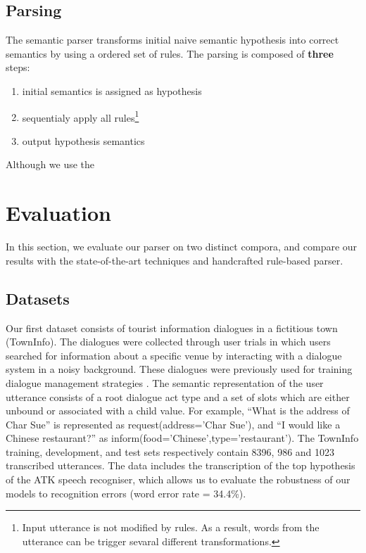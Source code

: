 \documentclass[11pt]{article}
\begin{document}
\subsection{Parsing}
The semantic parser transforms initial naive semantic hypothesis into correct semantics by using a ordered set of rules. The parsing is composed of \textbf{three} steps: 
\begin{enumerate}
  \item initial semantics is assigned as hypothesis
  \item sequentialy apply all rules\footnote{Input utterance is not modified by rules. As a result, words from the utterance can be trigger sevaral different transformations.}
  \item output hypothesis semantics
\end{enumerate}






Although we use the 


\section{Evaluation}

In this section, we evaluate our parser on two distinct compora, and compare our results with the state-of-the-art techniques and handcrafted rule-based parser. 

\subsection{Datasets}

Our first dataset consists of tourist information dialogues in a fictitious
town (TownInfo). The dialogues were collected through user
trials in which users searched for information about a specific venue
by interacting with a dialogue system in a noisy background. These
dialogues were previously used for training dialogue management
strategies \cite{williams07,thomson08}. The semantic representation of the user utterance consists of a root dialogue act type and a set of slots which are either
unbound or associated with a child value. For example, ``What is
the address of Char Sue'' is represented as request(address='Char Sue'), and ``I would like a Chinese restaurant?'' as inform(food='Chinese',type='restaurant'). The TownInfo training, development, and test sets respectively contain
8396, 986 and 1023 transcribed utterances.  The data includes the transcription of the top hypothesis of the ATK speech recogniser,
which allows us to evaluate the robustness of our models to recognition
errors (word error rate = 34.4\%). 
\end{document}
